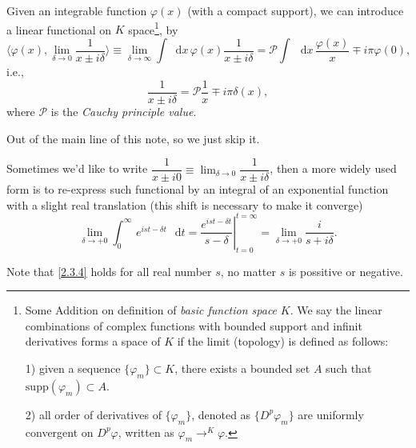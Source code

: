 \documentclass[b5paper,10pt,UTF8]{book}
\newcommand*\dd{\mathop{}\!\mathrm{d}}
\numberwithin{equation}{section}
\begin{document}
			\begin{Lemma}
				Given an integrable function $\varphi(x)$ (with a compact support), we can introduce a linear functional on $K$ space\footnote{Some Addition on definition of \emph{basic function space} $K$. We say the linear combinations of complex functions with bounded support and infinit derivatives forms a space of $K$ if the limit (topology) is defined as follows:\par
				1) given a sequence $\{\varphi_m\}\subset K$, there exists a bounded set $A$ such that $\mathrm{supp}(\varphi_m)\subset A$.\par
				2) all order of derivatives of $\{\varphi_m\}$, denoted as $\{D^p \varphi_m\}$ are uniformly convergent on $D^p \varphi$, written as $\displaystyle\varphi_m\mathop{\rightarrow}^{K}\varphi$.}, by
				\begin{equation}\label{2.3.3}
					\bigg\langle\varphi(x),\lim_{\delta\rightarrow0}\dfrac{1}{x\pm i\delta}\bigg\rangle\equiv\lim_{\delta\rightarrow\infty}\int\dd x\,\varphi(x)\dfrac{1}{x\pm i\delta}=\mathcal{P}\int\,\dd x\,\dfrac{\varphi(x)}{x}\mp i\pi \varphi(0),
				\end{equation}
				i.e.,
				$$\dfrac{1}{x\pm i\delta}=\mathcal{P}\dfrac{1}{x}\mp i\pi\delta(x),$$
				where $\mathcal{P}$ is the \emph{Cauchy principle value}.
			\end{Lemma}
			\begin{Proof}
				Out of the main line of this note, so we just skip it.
			\end{Proof}
			Sometimes we'd like to write $\dfrac{1}{x\pm i0}\equiv\displaystyle\lim_{\delta\rightarrow0}\dfrac{1}{x\pm i\delta}$, then a more widely used form is to re-express such functional by an integral of an exponential function with a slight real translation (this shift is necessary to make it converge)
			\begin{equation}\label{2.3.4}
				\lim_{\delta\rightarrow+0}\int_0^\infty\,e^{ist-\delta t}\,\dd t=\left.\dfrac{e^{ist-\delta t}}{s-\delta}\right|_{t=0}^{t=\infty}=\lim_{\delta\rightarrow+0}\dfrac{i}{s+ i\delta}.
			\end{equation}
			\begin{Note}
				Note that \eqref{2.3.4} holds for all real number $s$, no matter $s$ is possitive or negative.
			\end{Note}
\end{document}
